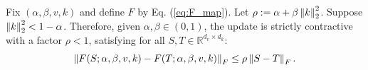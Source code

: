 




































\begin{lemma}
\label{lem:gla_contraction}
Fix $(\alpha,\beta,v,k)$ and define $F$ by Eq. (\ref{eq:F_map}). Let $\rho:=\alpha + \beta \left\lVert k \right\rVert_2^2$.  Suppose $ \left\lVert k \right\rVert_2^2 < 1-\alpha$. Therefore, given $\alpha, \beta \in (0, 1)$, the update is strictly contractive with a factor $\rho < 1$, satisfying for all $S, T \in \mathbb{R}^{d_v \times d_k}$:
\begin{equation}
\left\lVert F(S;\alpha,\beta,v,k)-F(T;\alpha,\beta,v,k) \right\rVert_F
\le
\rho \left\lVert S-T \right\rVert_F.
\label{eq:gla_contraction_result}
\end{equation}
\end{lemma}



